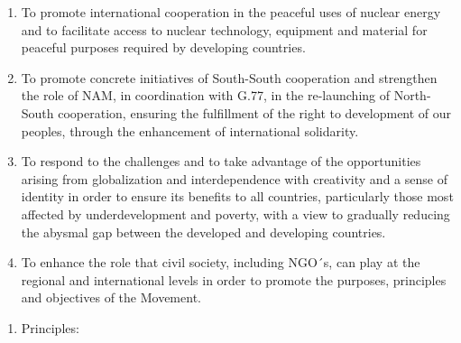 \documentclass[
  openany]{book}
\providecommand{\tightlist}{%
  \setlength{\itemsep}{0pt}\setlength{\parskip}{0pt}}
\begin{document}
\begin{enumerate}
\item
  To promote international cooperation in the peaceful uses of nuclear energy and to facilitate access to nuclear technology, equipment and material for peaceful purposes required by developing countries.
\item
  To promote concrete initiatives of South-South cooperation and strengthen the role of NAM, in coordination with G.77, in the re-launching of North-South cooperation, ensuring the fulfillment of the right to development of our peoples, through the enhancement of international solidarity.
\item
  To respond to the challenges and to take advantage of the opportunities arising from globalization and interdependence with creativity and a sense of identity in order to ensure its benefits to all countries, particularly those most affected by underdevelopment and poverty, with a view to gradually reducing the abysmal gap between the developed and developing countries.
\item
  To enhance the role that civil society, including NGO´s, can play at the regional and international levels in order to promote the purposes, principles and objectives of the Movement.
\end{enumerate}

\begin{enumerate}
\def\labelenumi{\Roman{enumi}.}
\setcounter{enumi}{1}
\tightlist
\item
  Principles:
\end{enumerate}
\end{document}
